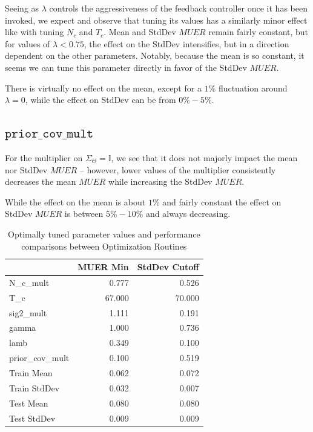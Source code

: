 Seeing as $\lambda$ controls the aggressiveness of the feedback controller once it has been invoked, we expect and observe that tuning its values has a similarly minor effect like with tuning $N_c$ and $T_c$.  Mean and StdDev $MUER$ remain fairly constant, but for values of $\lambda < 0.75$, the effect on the StdDev intensifies, but in a direction dependent on the other parameters.  Notably, because the mean is so constant, it seems we can tune this parameter directly in favor of the StdDev $MUER$.

There is virtually no effect on the mean, except for a $1\%$ fluctuation around $\lambda = 0$, while the effect on StdDev can be from $0\% - 5\%$.

\subsection{$\mathtt{prior\_cov\_mult}$}

For the multiplier on $\Sigma_\Theta = \mathbb{I}$, we see that it does not majorly impact the mean nor StdDev $MUER$ -- however, lower values of the multiplier consistently decreases the mean $MUER$ while increasing the StdDev $MUER$.

While the effect on the mean is about $1\%$ and fairly constant the effect on StdDev $MUER$ is between $5\% - 10\%$ and always decreasing.



  \begin{table}[!h]
	  \centering
\begin{tabular}{|l|rr|}
\toprule
{} &  MUER Min &  StdDev Cutoff \\
\midrule
N\_c\_mult       &     0.777 &          0.526 \\
T\_c            &    67.000 &         70.000 \\
sig2\_mult      &     1.111 &          0.191 \\
gamma          &     1.000 &          0.736 \\
lamb           &     0.349 &          0.100 \\
prior\_cov\_mult &     0.100 &          0.519 \\
\midrule
Train Mean     &     0.062 &          0.072 \\
Train StdDev   &     0.032 &          0.007 \\
Test Mean      &     0.080 &          0.080 \\
Test StdDev    &     0.009 &          0.009 \\
\bottomrule
\end{tabular}
\caption{Optimally tuned parameter values and performance comparisons between Optimization Routines}
\end{table}


